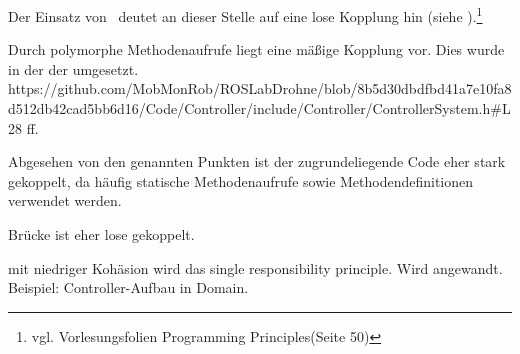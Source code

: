 

Der Einsatz von \ROS\ deutet an dieser Stelle auf eine lose Kopplung hin (siehe ).\footnote{vgl. Vorlesungsfolien \glq Programming Principles\grq (Seite 50)} 

Durch polymorphe Methodenaufrufe liegt eine mäßige Kopplung vor. Dies wurde in der  der  umgesetzt.
https://github.com/MobMonRob/ROSLabDrohne/blob/8b5d30dbdfbd41a7e10fa8d512db42cad5bb6d16/Code/Controller/include/Controller/ControllerSystem.h\#L28 ff.

Abgesehen von den genannten Punkten ist der zugrundeliegende Code eher stark gekoppelt, da häufig statische Methodenaufrufe sowie Methodendefinitionen verwendet werden.




Brücke ist eher lose gekoppelt. \missing[prüfen!]






mit niedriger Kohäsion wird das single responsibility principle.
Wird angewandt. Beispiel: Controller-Aufbau in Domain.



